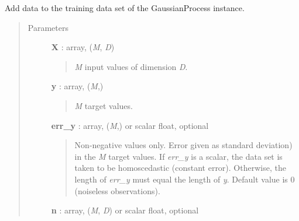 \documentclass[letterpaper,10pt,english]{sphinxmanual}
\begin{document}
\begin{fulllineitems}

\begin{fulllineitems}
\label{gptools:gptools.gaussian_process.GaussianProcess.free_param_bounds}
\end{fulllineitems}


\begin{fulllineitems}
\label{gptools:gptools.gaussian_process.GaussianProcess.free_param_names}
\end{fulllineitems}


\begin{fulllineitems}
\label{gptools:gptools.gaussian_process.GaussianProcess.add_data}
Add data to the training data set of the GaussianProcess instance.
\begin{quote}\begin{description}
\item[{Parameters}] \leavevmode
\textbf{X} : array, (\emph{M}, \emph{D})
\begin{quote}

\emph{M} input values of dimension \emph{D}.
\end{quote}

\textbf{y} : array, (\emph{M},)
\begin{quote}

\emph{M} target values.
\end{quote}

\textbf{err\_y} : array, (\emph{M},) or scalar float, optional
\begin{quote}

Non-negative values only. Error given as standard deviation) in the
\emph{M} target values. If \emph{err\_y} is a scalar, the data set is taken to
be homoscedastic (constant error). Otherwise, the length of \emph{err\_y}
must equal the length of \emph{y}. Default value is 0 (noiseless
observations).
\end{quote}

\textbf{n} : array, (\emph{M}, \emph{D}) or scalar float, optional
\begin{quote}


\end{quote}
\end{description}
\end{quote}
\end{fulllineitems}
\end{fulllineitems}
\end{document}
